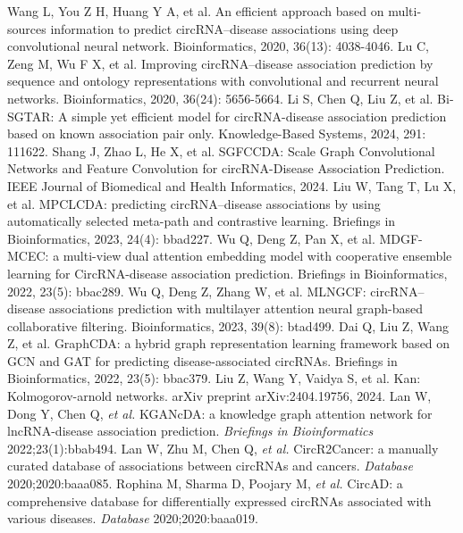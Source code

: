 \documentclass{bioinfo}
\begin{document}
\begin{thebibliography}{}
%
Wang L, You Z H, Huang Y A, et al. An efficient approach based on multi-sources information to predict circRNA–disease associations using deep convolutional neural network. Bioinformatics, 2020, 36(13): 4038-4046.
%
Lu C, Zeng M, Wu F X, et al. Improving circRNA–disease association prediction by sequence and ontology representations with convolutional and recurrent neural networks. Bioinformatics, 2020, 36(24): 5656-5664.
%
Li S, Chen Q, Liu Z, et al. Bi-SGTAR: A simple yet efficient model for circRNA-disease association prediction based on known association pair only. Knowledge-Based Systems, 2024, 291: 111622.
Shang J, Zhao L, He X, et al. SGFCCDA: Scale Graph Convolutional Networks and Feature Convolution for circRNA-Disease Association Prediction. IEEE Journal of Biomedical and Health Informatics, 2024.
Liu W, Tang T, Lu X, et al. MPCLCDA: predicting circRNA–disease associations by using automatically selected meta-path and contrastive learning. Briefings in Bioinformatics, 2023, 24(4): bbad227.
Wu Q, Deng Z, Pan X, et al. MDGF-MCEC: a multi-view dual attention embedding model with cooperative ensemble learning for CircRNA-disease association prediction. Briefings in Bioinformatics, 2022, 23(5): bbac289.
Wu Q, Deng Z, Zhang W, et al. MLNGCF: circRNA–disease associations prediction with multilayer attention neural graph-based collaborative filtering. Bioinformatics, 2023, 39(8): btad499.
Dai Q, Liu Z, Wang Z, et al. GraphCDA: a hybrid graph representation learning framework based on GCN and GAT for predicting disease-associated circRNAs. Briefings in Bioinformatics, 2022, 23(5): bbac379.
Liu Z, Wang Y, Vaidya S, et al. Kan: Kolmogorov-arnold networks. arXiv preprint arXiv:2404.19756, 2024.
%
Lan W, Dong Y, Chen Q, {\it et al.} KGANcDA: a knowledge graph attention network for lncRNA-disease association prediction. {\it Briefings in Bioinformatics} 2022;23(1):bbab494.
Lan W, Zhu M, Chen Q, {\it et al.} CircR2Cancer: a manually curated database of associations between circRNAs and cancers. {\it Database} 2020;2020:baaa085.
Rophina M, Sharma D, Poojary M, {\it et al.} CircAD: a comprehensive database for differentially expressed circRNAs associated with various diseases. {\it Database} 2020;2020:baaa019.

\end{thebibliography}
\end{document}
